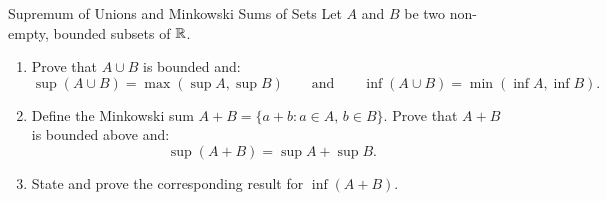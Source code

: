 \begin{exercise}{Supremum of Unions and Minkowski Sums of Sets}
Let $A$ and $B$ be two non-empty, bounded subsets of $\mathbb{R}$.
\begin{enumerate}[leftmargin=1.5em,itemsep=2pt]
  \item Prove that $A \cup B$ is bounded and:
  \[
  \sup(A \cup B) = \max(\sup A, \sup B) \qquad \text{and} \qquad \inf(A \cup B) = \min(\inf A, \inf B).
  \]
  \item Define the Minkowski sum $A + B = \{a + b : a \in A,\, b \in B\}$.
  Prove that $A + B$ is bounded above and:
  \[
  \sup(A + B) = \sup A + \sup B.
  \]
  \item State and prove the corresponding result for $\inf(A + B)$.
\end{enumerate}
\end{exercise}

\begin{tabletworkspace}[5.5cm]
\end{tabletworkspace}

